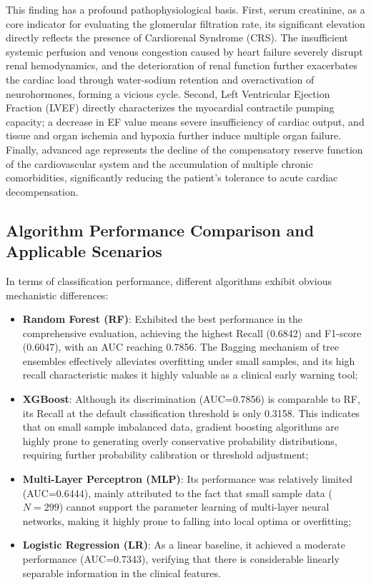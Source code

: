 \documentclass[12pt, a4paper]{article}
\begin{document}
This finding has a profound pathophysiological basis. First, serum creatinine, as a core indicator for evaluating the glomerular filtration rate, its significant elevation directly reflects the presence of Cardiorenal Syndrome (CRS). The insufficient systemic perfusion and venous congestion caused by heart failure severely disrupt renal hemodynamics, and the deterioration of renal function further exacerbates the cardiac load through water-sodium retention and overactivation of neurohormones, forming a vicious cycle. Second, Left Ventricular Ejection Fraction (LVEF) directly characterizes the myocardial contractile pumping capacity; a decrease in EF value means severe insufficiency of cardiac output, and tissue and organ ischemia and hypoxia further induce multiple organ failure. Finally, advanced age represents the decline of the compensatory reserve function of the cardiovascular system and the accumulation of multiple chronic comorbidities, significantly reducing the patient's tolerance to acute cardiac decompensation.

\subsection{Algorithm Performance Comparison and Applicable Scenarios}
In terms of classification performance, different algorithms exhibit obvious mechanistic differences:
\begin{itemize}
    \item \textbf{Random Forest (RF)}: Exhibited the best performance in the comprehensive evaluation, achieving the highest Recall (0.6842) and F1-score (0.6047), with an AUC reaching 0.7856. The Bagging mechanism of tree ensembles effectively alleviates overfitting under small samples, and its high recall characteristic makes it highly valuable as a clinical early warning tool;
    \item \textbf{XGBoost}: Although its discrimination (AUC=0.7856) is comparable to RF, its Recall at the default classification threshold is only 0.3158. This indicates that on small sample imbalanced data, gradient boosting algorithms are highly prone to generating overly conservative probability distributions, requiring further probability calibration or threshold adjustment;
    \item \textbf{Multi-Layer Perceptron (MLP)}: Its performance was relatively limited (AUC=0.6444), mainly attributed to the fact that small sample data ($N=299$) cannot support the parameter learning of multi-layer neural networks, making it highly prone to falling into local optima or overfitting;
    \item \textbf{Logistic Regression (LR)}: As a linear baseline, it achieved a moderate performance (AUC=0.7343), verifying that there is considerable linearly separable information in the clinical features.
\end{itemize}
\end{document}
